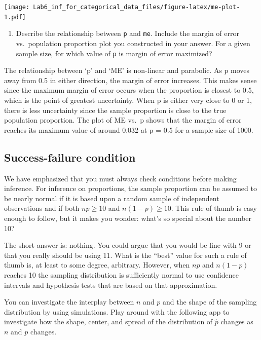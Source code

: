 \documentclass[
]{article}
\providecommand{\tightlist}{%
  \setlength{\itemsep}{0pt}\setlength{\parskip}{0pt}}
\begin{document}
\texttt{[image: Lab6\_inf\_for\_categorical\_data\_files/figure-latex/me-plot-1.pdf]}

\begin{enumerate}
\def\labelenumi{\arabic{enumi}.}
\setcounter{enumi}{4}
\tightlist
\item
  Describe the relationship between \texttt{p} and \texttt{me}. Include
  the margin of error vs.~population proportion plot you constructed in
  your answer. For a given sample size, for which value of \texttt{p} is
  margin of error maximized?
\end{enumerate}

The relationship between `p' and `ME' is non-linear and parabolic. As p
moves away from 0.5 in either direction, the margin of error increases.
This makes sense since the maximum margin of error occurs when the
proportion is closest to 0.5, which is the point of greatest
uncertainty. When p is either very close to 0 or 1, there is less
uncertainty since the sample proportion is close to the true population
proportion. The plot of ME vs.~p shows that the margin of error reaches
its maximum value of around 0.032 at p = 0.5 for a sample size of 1000.

\hypertarget{success-failure-condition}{%
\subsection{Success-failure condition}\label{success-failure-condition}}

We have emphasized that you must always check conditions before making
inference. For inference on proportions, the sample proportion can be
assumed to be nearly normal if it is based upon a random sample of
independent observations and if both \(np \geq 10\) and
\(n(1 - p) \geq 10\). This rule of thumb is easy enough to follow, but
it makes you wonder: what's so special about the number 10?

The short answer is: nothing. You could argue that you would be fine
with 9 or that you really should be using 11. What is the ``best'' value
for such a rule of thumb is, at least to some degree, arbitrary.
However, when \(np\) and \(n(1-p)\) reaches 10 the sampling distribution
is sufficiently normal to use confidence intervals and hypothesis tests
that are based on that approximation.

You can investigate the interplay between \(n\) and \(p\) and the shape
of the sampling distribution by using simulations. Play around with the
following app to investigate how the shape, center, and spread of the
distribution of \(\hat{p}\) changes as \(n\) and \(p\) changes.
\end{document}
